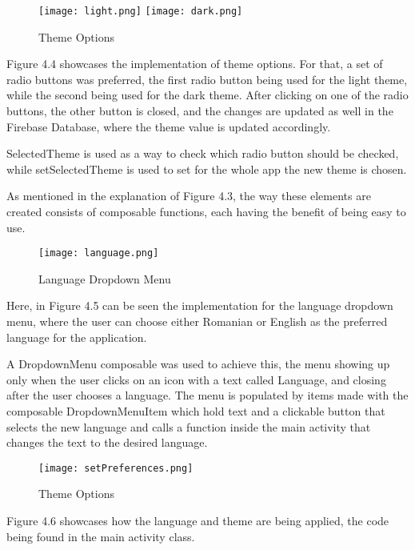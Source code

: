 \begin{figure}[htp]
    \centering
    \texttt{[image: light.png]}
    \texttt{[image: dark.png]}
    \caption{Theme Options}
    \label{fig: Theme Options}
\end{figure}

Figure 4.4 showcases the implementation of theme options. For that, a set of radio buttons was preferred, the first radio button being used for the light theme, while the second being used for the dark theme. After clicking on one of the radio buttons, the other button is closed, and the changes are updated as well in the Firebase Database, where the theme value is updated accordingly.

SelectedTheme is used as a way to check which radio button should be checked, while setSelectedTheme is used to set for the whole app the new theme is chosen.

As mentioned in the explanation of Figure 4.3, the way these elements are created consists of composable functions, each having the benefit of being easy to use.

\newpage

\begin{figure}[htp]
    \centering
    \texttt{[image: language.png]}
    \caption{Language Dropdown Menu}
    \label{fig: Language Dropdown Menu}
\end{figure}

Here, in Figure 4.5 can be seen the implementation for the language dropdown menu, where the user can choose either Romanian or English as the preferred language for the application.

A DropdownMenu composable was used to achieve this, the menu showing up only when the user clicks on an icon with a text called Language, and closing after the user chooses a language. The menu is populated by items made with the composable DropdownMenuItem which hold text and a clickable button that selects the new language and calls a function inside the main activity that changes the text to the desired language.

\newpage

\begin{figure}[htp]
    \centering
    \texttt{[image: setPreferences.png]}
    \caption{Theme Options}
    \label{fig: Applying the preferences}
\end{figure}

Figure 4.6 showcases how the language and theme are being applied, the code being found in the main activity class.

